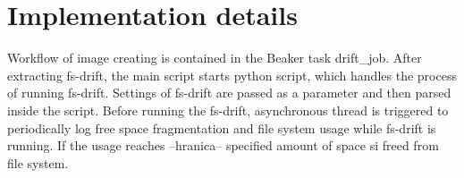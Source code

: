 \documentclass[
  color, %
  table, %
  lof,   %
  lot,   %
]{fithesis3}
\begin{document}





\section{Implementation details}
Workflow of image creating is contained in the Beaker task drift\_job. After extracting fs-drift, the main script starts python script, which handles the process of running fs-drift. Settings of fs-drift are passed as a parameter and then parsed inside the script. Before running the fs-drift, asynchronous thread is triggered to periodically log free space fragmentation and file system usage while fs-drift is running. If the usage reaches --hranica-- specified amount of space si freed from file system\footnotemark[2].
\end{document}
